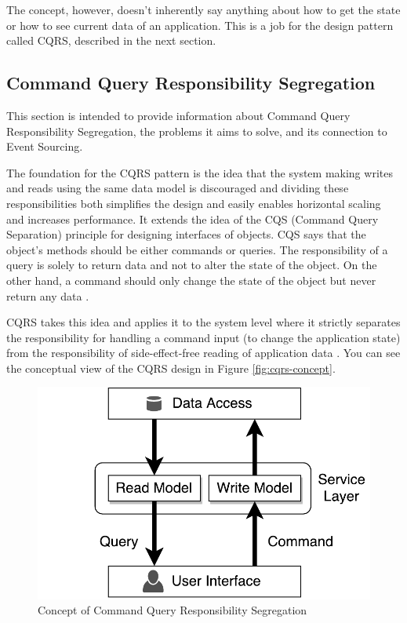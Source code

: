 \documentclass{book}
\begin{document}
The concept, however, doesn't inherently say anything about how to get
the state or how to see current data of an application. This is a job
for the design pattern called CQRS, described in the next section.


\subsection{Command Query Responsibility
Segregation}\label{command-query-responsibility-segregation}

This section is intended to provide information about Command Query
Responsibility Segregation, the problems it aims to solve, and its
connection to Event Sourcing.

The foundation for the CQRS pattern is the idea that the system making
writes and reads using the same data model is discouraged and dividing
these responsibilities both simplifies the design and easily enables
horizontal scaling and increases performance. It extends the idea of the
CQS (Command Query Separation) principle for designing interfaces of
objects. CQS says that the object's methods should be either commands or
queries. The responsibility of a query is solely to return data and not
to alter the state of the object. On the other hand, a command should
only change the state of the object but never return any data
\cite{journey}.

CQRS takes this idea and applies it to the system level where it
strictly separates the responsibility for handling a command input (to
change the application state) from the responsibility of
side-effect-free reading of application data \cite{journey}. You can see
the conceptual view of the CQRS design in Figure \ref{fig:cqrs-concept}.


\begin{figure}[h!]
\begin{center}
\includegraphics[width=0.49\columnwidth]{figures/cqrs-concept/cqrs-concept}
\caption{Concept of Command Query Responsibility Segregation%
}
\end{center}
\end{figure}
\end{document}
